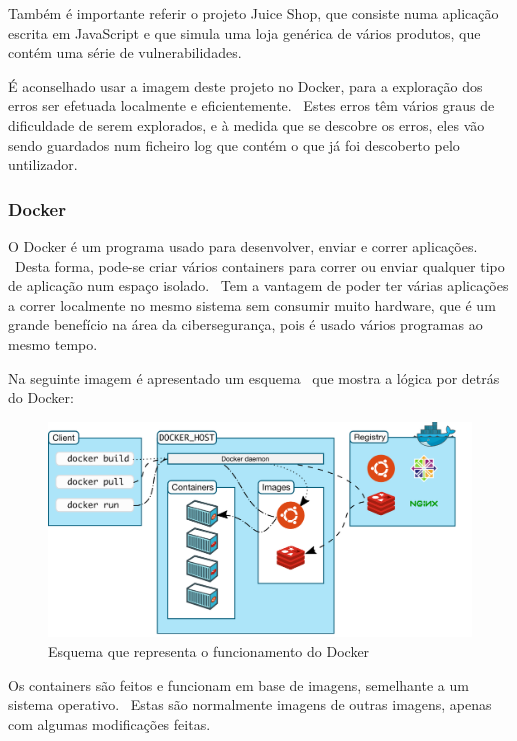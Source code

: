 \documentclass{report}
\begin{document}
Também é importante referir o projeto Juice Shop, que consiste numa aplicação escrita em JavaScript e que simula uma loja genérica de vários produtos, que contém uma série de vulnerabilidades. \par
É aconselhado usar a imagem deste projeto no Docker, para a exploração dos erros ser efetuada localmente e eficientemente. \ Estes erros têm vários graus de dificuldade de serem explorados, e à medida que se descobre os erros, eles vão sendo guardados num ficheiro log que contém o que já foi descoberto pelo untilizador.

\subsubsection{Docker}
\label{subsubsec:docker}
O Docker é um programa usado para desenvolver, enviar e correr aplicações. \ Desta forma, pode-se criar vários containers para correr ou enviar qualquer tipo de aplicação num espaço isolado. \ Tem a vantagem de poder ter várias aplicações a correr localmente no mesmo sistema sem consumir muito hardware, que é um grande benefício na área da cibersegurança, pois é usado vários programas ao mesmo tempo. \bigskip

\newpage

Na seguinte imagem é apresentado um esquema~\cite{docker-logic} que mostra a lógica por detrás do Docker:

\begin{figure}[h]
    \centering
    \includegraphics[width=350pt]{docker-scheme}
    \caption{Esquema que representa o funcionamento do Docker}
    \label{fig:docker-scheme}
\end{figure}

Os containers são feitos e funcionam em base de imagens, semelhante a um sistema operativo. \ Estas são normalmente imagens de outras imagens, apenas com algumas modificações feitas. \bigskip
\end{document}
